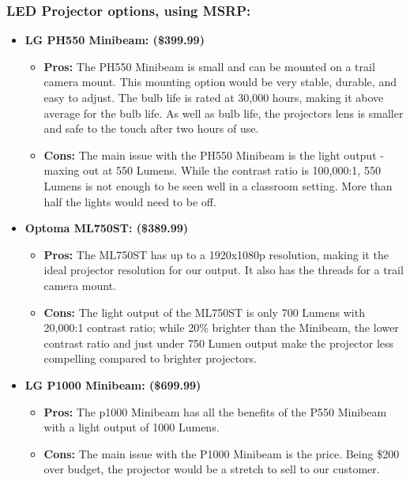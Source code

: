 \documentclass[IEEEtran]{article}
\begin{document}
\subsubsection{LED Projector options, using MSRP:}
\begin{itemize}
    \item \textbf{LG PH550 Minibeam: (\$399.99)}
    \begin{itemize}
        \item \textbf{Pros: } The PH550 Minibeam is small and can be mounted on a trail camera mount. This mounting option would be very stable, durable, and easy to adjust. The bulb life is rated at 30,000 hours, making it above average for the bulb life. As well as bulb life, the projectors lens is smaller and safe to the touch after two hours of use. 
        \item \textbf{Cons: } The main issue with the PH550 Minibeam is the light output - maxing out at 550 Lumens. While the contrast ratio is 100,000:1, 550 Lumens is not enough to be seen well in a classroom setting. More than half the lights would need to be off. 
    \end{itemize}
     \item \textbf{Optoma ML750ST: (\$389.99)}
    \begin{itemize}
        \item \textbf{Pros: } The ML750ST has up to a 1920x1080p resolution, making it the ideal projector resolution for our output. It also has the threads for a trail camera mount. 
        \item \textbf{Cons: } The light output of the ML750ST is only 700 Lumens with 20,000:1 contrast ratio; while 20\% brighter than the Minibeam, the lower contrast ratio and just under 750 Lumen output make the projector less compelling compared to brighter projectors. 
    \end{itemize}
    \item \textbf{LG P1000 Minibeam: (\$699.99)}
    \begin{itemize}
        \item \textbf{Pros: } The p1000 Minibeam has all the benefits of the P550 Minibeam with a light output of 1000 Lumens. 
        \item \textbf{Cons: } The main issue with the P1000 Minibeam is the price. Being \$200 over budget, the projector would be a stretch to sell to our customer. 
    \end{itemize}
\end{itemize}
\end{document}
